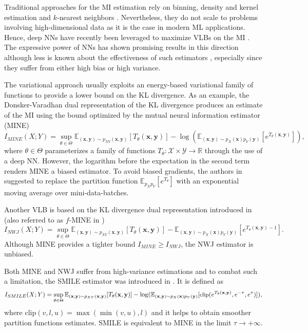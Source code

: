 Traditional approaches for the MI estimation rely on binning, density and kernel estimation \cite{Moon1995} and $k$-nearest neighbors \cite{Kraskov2004}. Nevertheless, they do not scale to problems involving high-dimensional data as it is the case in modern ML applications. Hence, deep NNs have recently been leveraged to maximize VLBs on the MI \cite{Poole2019,Nguyen2010, Mine2018}. The expressive power of NNs has shown promising results in this direction although less is known about the effectiveness of such estimators \cite{Song2020}, especially since they suffer from either high bias or high variance. 

The variational approach usually exploits an energy-based variational family of functions to provide a lower bound on the KL divergence. As an example, the Donsker-Varadhan dual representation of the KL divergence \cite{Poole2019,Donsker1983} produces an estimate of the MI using the bound optimized by the mutual neural information estimator (MINE) \cite{Mine2018}
\begin{equation}
\label{eq:MI_MINE}
I_{MINE}(X;Y) = \sup_{\theta \in \Theta} \mathbb{E}_{(\mathbf{x},\mathbf{y})\sim p_{XY}(\mathbf{x},\mathbf{y})}[T_{\theta}(\mathbf{x},\mathbf{y})]  -\log(\mathbb{E}_{(\mathbf{x},\mathbf{y})\sim p_X(\mathbf{x}) p_Y(\mathbf{y})}[e^{T_{\theta}(\mathbf{x},\mathbf{y})}]),
\end{equation}
where $\theta \in \Theta$ parameterizes a family of functions $T_{\theta} : \mathcal{X}\times \mathcal{Y} \to \mathbb{R}$ through the use of a deep NN. However, the logarithm before the expectation in the second term renders MINE a biased estimator. To avoid biased gradients, the authors in \cite{Mine2018} suggested to replace the partition function $\mathbb{E}_{p_X p_Y}[e^{T_{\theta}}]$ with an exponential moving average over mini-data-batches.


Another VLB is based on the KL divergence dual representation introduced in \cite{Nguyen2010} (also referred to as $f$-MINE in \cite{Mine2018})
\begin{equation}
\label{eq:MI_NWJ}
I_{NWJ}(X;Y) = \sup_{\theta \in \Theta} \mathbb{E}_{(\mathbf{x},\mathbf{y})\sim p_{XY}(\mathbf{x},\mathbf{y})}[T_{\theta}(\mathbf{x},\mathbf{y})]  -\mathbb{E}_{(\mathbf{x},\mathbf{y})\sim p_X(\mathbf{x}) p_Y(\mathbf{y})}[e^{T_{\theta}(\mathbf{x},\mathbf{y})-1}].
\end{equation}
Although MINE provides a tighter bound $I_{MINE}\geq I_{NWJ}$, the NWJ estimator is unbiased. 

Both MINE and NWJ suffer from high-variance estimations and to combat such a limitation, the SMILE estimator was introduced in \cite{Song2020}. It is defined as
\begin{equation}
\small
\label{eq:MI_SMILE}
I_{SMILE}(X;Y) = \sup_{\theta \in \Theta} \mathbb{E}_{(\mathbf{x},\mathbf{y})\sim p_{XY}(\mathbf{x},\mathbf{y})}[T_{\theta}(\mathbf{x},\mathbf{y})] 
 -\log(\mathbb{E}_{(\mathbf{x},\mathbf{y})\sim p_X(\mathbf{x}) p_Y(\mathbf{y})}[\text{clip}(e^{T_{\theta}(\mathbf{x},\mathbf{y})},e^{-\tau},e^{\tau})]),
\end{equation}
where $\text{clip}(v,l,u) = \max(\min(v,u),l)$ and it helps to obtain smoother partition functions estimates. SMILE is equivalent to MINE in the limit $\tau \to +\infty$. 

